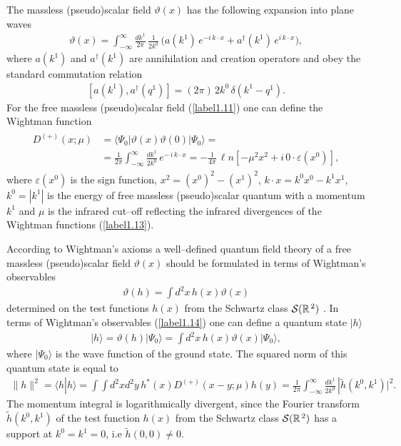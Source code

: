 \documentclass[a4paper,12pt] {article}
\begin{document}
The massless (pseudo)scalar field $\vartheta(x)$ has the following
expansion into plane waves \cite{th0105057,th0112184,th0204237,
th0206244}
%
\begin{eqnarray}\label{label1.11}
\vartheta(x) =
\int^{\infty}_{-\infty}\frac{dk^1}{2\pi}\,\frac{1}{2k^0}\,
\Big(a(k^1)\,e^{\textstyle -i\,k\cdot x} +
a^{\dagger}(k^1)\,e^{\textstyle i\,k\cdot x}\Big),
\end{eqnarray}
%
where $a(k^1)$ and $a^{\dagger}(k^1)$ are annihilation and creation
operators and obey the standard commutation relation
\cite{th0105057,th0112184,th0204237,th0206244}
%
\begin{eqnarray}\label{label1.12}
[a(k^1), a^{\dagger}(q^1)] = (2\pi)\,2k^0\,\delta(k^1 - q^1).
\end{eqnarray}
%
For the free massless (pseudo)scalar field (\ref{label1.11}) one can
define the Wightman function
%
\begin{eqnarray}\label{label1.13}
\begin{aligned}
D^{(+)}(x; \mu) &= \langle
\Psi_0|\vartheta(x)\vartheta(0)|\Psi_0\rangle =\\
&=\frac{1}{2\pi}\int^{\infty}_{-\infty}\frac{dk^1}{2k^0}\,
e^{\textstyle -\,i\,k\cdot x} = - \frac{1}{4\pi}\,{\ell n}[-\mu^2x^2 +
i\,0\cdot\varepsilon(x^0)],
\end{aligned}
\end{eqnarray}
%
where $\varepsilon(x^0)$ is the sign function, $x^2 = (x^0)^2 -
(x^1)^2$, $k\cdot x = k^0x^0 - k^1x^1$, $k^0 = |k^1|$ is the energy of
free massless (pseudo)scalar quantum with a momentum $k^1$ and $\mu$
is the infrared cut--off reflecting the infrared divergences of the
Wightman functions (\ref{label1.13}). 

According to Wightman's axioms \cite{Wi64} a well--defined quantum
field theory of a free massless (pseudo)scalar field $\vartheta(x)$
should be formulated in terms of Wightman's observables
%
\begin{eqnarray}\label{label1.14}
 \vartheta(h) = \int d^2x\,h(x)\vartheta(x)
\end{eqnarray}
%
determined on the test functions $h(x)$ from the Schwartz class ${\cal
S}(\mathbb{R}^{\,2})$ \cite{Wi64}. In terms of Wightman's observables
(\ref{label1.14}) one can define a quantum state $|h\rangle$
\cite{Wi64}
%
\begin{eqnarray}\label{label1.15}
|h\rangle = \vartheta(h)|\Psi_0\rangle = \int
 d^2x\,h(x)\vartheta(x)|\Psi_0\rangle,
\end{eqnarray}
%
where $|\Psi_0\rangle$ is the wave function of the ground state.  The
squared norm of this quantum state is equal to \cite{th0112184}
%
\begin{eqnarray}\label{label1.16}
\|h\|^2 = \langle h| h\rangle = \int\!\!\!\int
  d^2xd^2y\,h^*(x)D^{(+)}(x -y; \mu)h(y) =
  \frac{1}{2\pi}\int^{\infty}_{-\infty}\frac{dk^1}{2k^0}\,
  |\tilde{h}(k^0,k^1)|^2.
\end{eqnarray}
%
The momentum integral is logarithmically divergent, since the Fourier
transform $\tilde{h}(k^0,k^1)$ of the test function $h(x)$ from the
Schwartz class ${\cal S}(\mathbb{R}^{\,2})$ has a support at $k^0 =
k^1 = 0$, i.e $\tilde{h}(0,0) \neq 0$.
\end{document}
